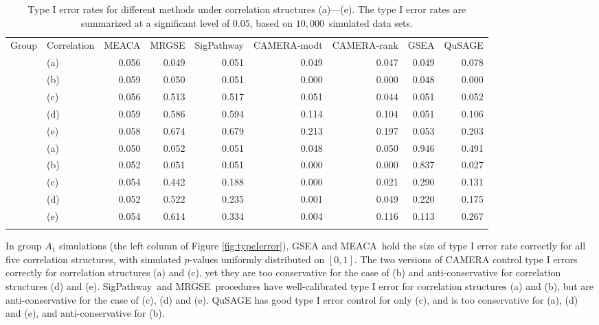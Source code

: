 \documentclass[a4,center,fleqn]{NAR}
\newcommand{\OurMethod}{MEACA}
\newcommand{\aaCase}{a}
\newcommand{\aCase}{c}
\newcommand{\cCase}{b}
\newcommand{\eCase}{d}
\newcommand{\fCase}{e}
\newcommand{\CMR}{CAMERA-rank}
\newcommand{\CMT}{CAMERA-modt}
\newcommand{\gent}{SigPathway}
\newcommand{\genr}{MRGSE}
\newcommand{\HowmanySimu}{$10,000$}
\begin{document}
	
		\begin{table}[th]
			\caption[Type I error rates for different methods]{Type I error rates for 
				different methods under correlation structures (a)---(e). The type I error rates 
				are summarized at a significant level of 0.05, based on \HowmanySimu~simulated data 
				sets.}
			\label{table:apptypeIerror1}
			\centering
			\begin{tabular}{llrrrrrrr}
				\toprule
				Group & Correlation & \OurMethod & \genr & \gent & \CMT & \CMR & GSEA & 
				QuSAGE 
				\\
				\colrule
				\multirow{5}{*}{$A_1$}  & (a) & 0.056 & 0.049 & 0.051 & 0.049 & 0.047 & 
				0.049 & 
				0.078 
				\\ 
				& (b) & 0.059 & 0.050 & 0.051 & 0.000 & 0.000 & 0.048 & 0.000 \\ 
				& (c) & 0.056 & 0.513 & 0.517 & 0.051 & 0.044 & 0.051 & 0.052 \\ 
				& (d) & 0.059 & 0.586 & 0.594 & 0.114 & 0.104 & 0.051 & 0.106 \\ 
				& (e) & 0.058 & 0.674 & 0.679 & 0.213 & 0.197 & 0.053 & 0.203 \\ \colrule
				\multirow{5}{*}{$A_2$} & (a) & 0.050 & 0.052 & 0.051 & 0.048 & 0.050 & 
				0.946 & 
				0.491 \\ 
				& (b) & 0.052 & 0.051 & 0.051 & 0.000 & 0.000 & 0.837 & 0.027 \\ 
				& (c) & 0.054 & 0.442 & 0.188 & 0.000 & 0.021 & 0.290 & 0.131 \\ 
				& (d) & 0.052 & 0.522 & 0.235 & 0.001 & 0.049 & 0.220 & 0.175 \\ 
				& (e) & 0.054 & 0.614 & 0.334 & 0.004 & 0.116 & 0.113 & 0.267 \\ 
				\botrule
			\end{tabular}
		\end{table}
		
	
	
	
	In group $A_1$ simulations (the left column of Figure \ref{fig:typeIerror}),  GSEA and
	\OurMethod~hold the size of type I error rate correctly for all five correlation structures, 
	with simulated $p$-values uniformly distributed on $[0, 1]$. The two versions of CAMERA control 
	type I errors correctly for correlation structures (\aaCase) and (\aCase), yet they are too 
	conservative for the case of (\cCase) and anti-conservative for correlation structures (\eCase) 
	and (\fCase). \gent~and \genr~procedures have well-calibrated type I error for correlation 
	structures (\aaCase) and (\cCase), but are anti-conservative for the case of (\aCase), (\eCase) 
	and (\fCase). QuSAGE has good type I error control for only (\aCase), and is too conservative 
	for (\aaCase), (\eCase) and	(\fCase), and anti-conservative for (\cCase).
	
\end{document}
